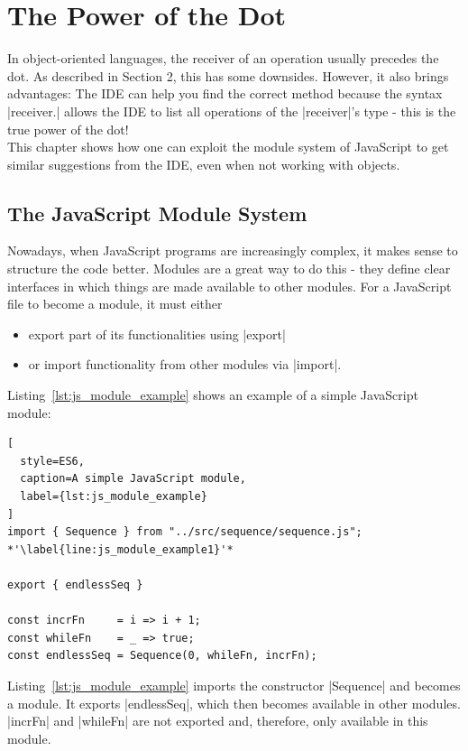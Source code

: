 \section{The Power of the Dot} %
\label{sec:The Power of the Dot}
In object-oriented languages, the receiver of an operation usually precedes the
dot. As described in Section 2, this has some downsides. However, it also
brings advantages: The IDE can help you find the correct method because the
syntax |receiver.| allows the IDE to list all operations of the |receiver|'s
type - this is the true power of the dot! \cite[Chapter "The Power of the
Dot"]{frege_goodness} \\ This chapter shows how one can exploit the module
system of JavaScript to get similar suggestions from the IDE, even when not
working with objects.

\subsection{The JavaScript Module System} %
\label{sub:The JavaScript Module System}

Nowadays, when JavaScript programs are increasingly complex, it makes sense to
structure the code better. Modules are a great way to do this - they define
clear interfaces in which things are made available to other modules.
For a JavaScript file to become a module, it must either
\begin{itemize}
  \item export part of its functionalities using |export|
  \item or import functionality from other modules via |import|.
\end{itemize}

Listing~\ref{lst:js_module_example} shows an example of a simple JavaScript
module:
\begin{lstlisting}[
  style=ES6,
  caption=A simple JavaScript module,
  label={lst:js_module_example}
]
import { Sequence } from "../src/sequence/sequence.js"; *'\label{line:js_module_example1}'*

export { endlessSeq }

const incrFn     = i => i + 1;
const whileFn    = _ => true;
const endlessSeq = Sequence(0, whileFn, incrFn);
\end{lstlisting}

Listing~\ref{lst:js_module_example} imports the constructor |Sequence| and
becomes a module. It exports |endlessSeq|, which then becomes available in
other modules. |incrFn| and |whileFn| are not exported and, therefore, only
available in this module.

